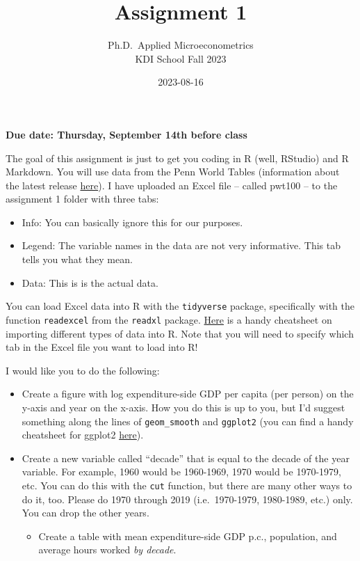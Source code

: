 \documentclass[
]{article}
\title{Assignment 1}
\subtitle{Ph.D.~Applied Microeconometrics\\
KDI School Fall 2023}
\author{}
\date{\vspace{-2.5em}2023-08-16}
\providecommand{\tightlist}{%
  \setlength{\itemsep}{0pt}\setlength{\parskip}{0pt}}
\begin{document}
\maketitle

\textbf{Due date: Thursday, September 14th before class}

The goal of this assignment is just to get you coding in R (well, RStudio) and R Markdown. You will use data from the Penn World Tables (information about the latest release \href{https://www.rug.nl/ggdc/productivity/pwt/pwt-releases/pwt100}{\textcolor{kdisgreen}{here}}). I have uploaded an Excel file -- called pwt100 -- to the assignment 1 folder with three tabs:

\begin{itemize}
\tightlist
\item
  Info: You can basically ignore this for our purposes.
\item
  Legend: The variable names in the data are not very informative. This tab tells you what they mean.
\item
  Data: This is is the actual data.
\end{itemize}

You can load Excel data into R with the \texttt{tidyverse} package, specifically with the function \texttt{readexcel} from the \texttt{readxl} package. \href{https://github.com/rstudio/cheatsheets/blob/main/data-import.pdf}{\textcolor{kdisgreen}{Here}} is a handy cheatsheet on importing different types of data into R. Note that you will need to specify which tab in the Excel file you want to load into R!

I would like you to do the following:

\begin{itemize}
\tightlist
\item
  Create a figure with log expenditure-side GDP per capita (per person) on the y-axis and year on the x-axis. How you do this is up to you, but I'd suggest something along the lines of \texttt{geom\_smooth} and \texttt{ggplot2} (you can find a handy cheatsheet for ggplot2 \href{https://www.maths.usyd.edu.au/u/UG/SM/STAT3022/r/current/Misc/data-visualization-2.1.pdf}{\textcolor{kdisgreen}{here}}).
\item
  Create a new variable called ``decade'' that is equal to the decade of the year variable. For example, 1960 would be 1960-1969, 1970 would be 1970-1979, etc. You can do this with the \texttt{cut} function, but there are many other ways to do it, too. Please do 1970 through 2019 (i.e.~1970-1979, 1980-1989, etc.) only. You can drop the other years.

  \begin{itemize}
  \tightlist
  \item
    Create a table with mean expenditure-side GDP p.c., population, and average hours worked \emph{by decade}.
  \end{itemize}
\end{itemize}
\end{document}
